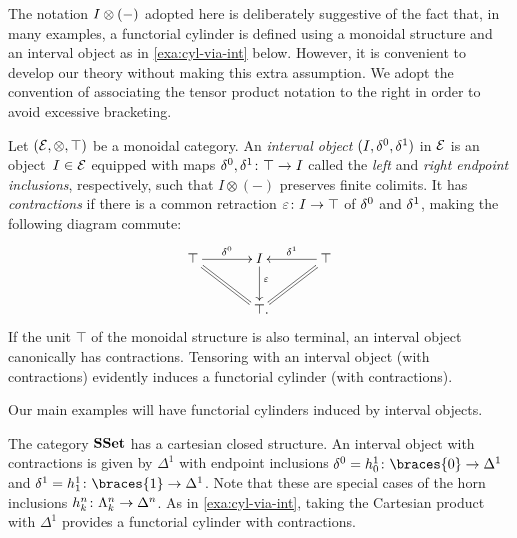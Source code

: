 \documentclass[reqno,10pt,a4paper,oneside,draft]{amsart}
\begin{document}
The notation $I \otimes (-)$ adopted here is deliberately suggestive of the fact that, in many examples, a functorial cylinder is defined using a monoidal structure and an interval object as in \cref{exa:cyl-via-int} below.
However, it is convenient to develop our theory without making this extra assumption.
We adopt the convention of associating the tensor product notation to the right in order to avoid excessive bracketing.

\begin{example} \label{exa:cyl-via-int}
Let $(\mathcal{E}, \otimes, \top)$ be a monoidal category.
An \emph{interval object} $(I, \delta^0, \delta^1)$ in $\mathcal{E}$ is an object~$I \in \mathcal{E}$ equipped with maps $\delta^0, \delta^1 \colon \top \to I$ called the \emph{left} and \emph{right endpoint inclusions}, respectively, such that $I \otimes (-)$ preserves finite colimits.
It has \emph{contractions} if there is a common retraction $\varepsilon \colon I \to \top$ of $\delta^0$ and $\delta^1$, making the following diagram commute:
\[
\xymatrix@C+1em{
  \top
  \ar[r]^-{\lcyl}
  \ar@{=}[dr]
&
  \interval
  \ar[d]^(0.4){\ccyl}
&
  \top
  \ar[l]_-{\rcyl}
  \ar@{=}[dl]
\\&
  \top
\rlap{.}}
\]
If the unit $\top$ of the monoidal structure is also terminal, an interval object canonically has contractions.
Tensoring with an interval object (with contractions) evidently induces a functorial cylinder (with contractions).
\end{example}

Our main examples will have functorial cylinders induced by interval objects.







\begin{example} \label{exa:cyl-in-sset}
The category $\mathbf{SSet}$ has a cartesian closed structure. An interval object with contractions is given by $\Delta^1$ with endpoint inclusions $\lcyl = h_0^1 \co \braces{0} \to \Delta^1$ and $\rcyl = h_1^1 \co \braces{1} \to \Delta^1$.
Note that these are special cases of the horn inclusions $h_k^n \colon \Lambda_k^n \to \Delta^n$.
As in \cref{exa:cyl-via-int}, taking the Cartesian product with $\Delta^1$ provides a functorial cylinder with contractions.
\end{example}
\end{document}
